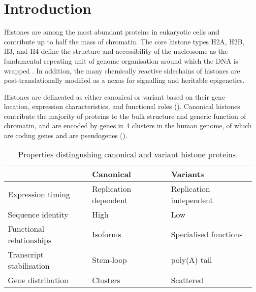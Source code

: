 \section{Introduction}

  Histones are among the most abundant proteins in eukaryotic cells
  and contribute up to half the mass of chromatin.
  The core histone types H2A, H2B, H3, and H4
  define the structure and accessibility of the nucleosome
  as the fundamental repeating unit of genome organisation
  around which the DNA is wrapped \citep{Luger1997structure}.
  In addition, the many chemically reactive sidechains of histones
  are post-translationally modified
  as a nexus for signalling and heritable epigenetics.

  Histones are delineated as either canonical or variant based on
  their gene location, expression characteristics,
  and functional roles ().
  Canonical histones contribute the majority of proteins to
  the bulk structure and generic function of chromatin,
  and are encoded by \TotalGenes{} genes in 4 clusters in the human genome,
  of which \TotalCodingGenes{} are coding genes and \TotalPseudoGenes{}
  are pseudogenes ().

  \begin{table}
    \caption{Properties distingushing canonical and variant histone proteins.}
    \label{tab:typical-histone-differences}
    \centering
    \begin{tabular}{l l l}
      \toprule
      \null                     & Canonical             & Variants \\
      \midrule
      Expression timing         & Replication dependent & Replication independent \\
      Sequence identity         & High                  & Low \\
      Functional relationships  & Isoforms              & Specialised functions \\
      Transcript stabilisation  & Stem-loop             & poly(A) tail \\
      Gene distribution         & Clusters              & Scattered \\
      \bottomrule
    \end{tabular}
  \end{table}

